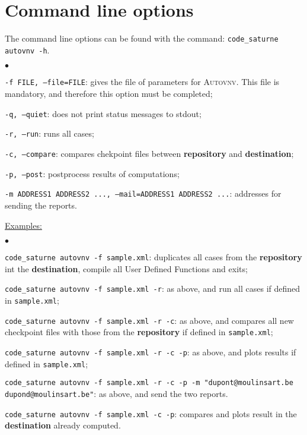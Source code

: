 \documentclass[a4paper,10pt,twoside]{article}
\begin{document}
\section{Command line options}

The command line options can be found with the command: \texttt{code\_saturne autovnv -h}.

\begin{list}{$\bullet$}{}
\item \texttt{-f FILE, --file=FILE}: gives the file of parameters for \textsc{Autovnv}.
This file is mandatory, and therefore this option must be completed;
\item \texttt{-q, --quiet}: does not print status messages to stdout;
\item \texttt{-r, --run}: runs all cases;
\item \texttt{-c, --compare}: compares chekpoint files between \textbf{repository} and \textbf{destination};
\item \texttt{-p, --post}: postprocess results of computations;
\item \texttt{-m ADDRESS1 ADDRESS2 ..., --mail=ADDRESS1 ADDRESS2 ...}: addresses for sending the reports.
\end{list}

\underline{Examples:}

\begin{list}{$\bullet$}{}
\item \texttt{code\_saturne autovnv -f sample.xml}: duplicates all cases from the \textbf{repository}
int the \textbf{destination}, compile all User Defined Functions and exits;
\item \texttt{code\_saturne autovnv -f sample.xml -r}: as above, and run all cases if defined
in \texttt{sample.xml};
\item \texttt{code\_saturne autovnv -f sample.xml -r -c}: as above, and compares all new checkpoint files
with those from the \textbf{repository} if defined in \texttt{sample.xml};
\item \texttt{code\_saturne autovnv -f sample.xml -r -c -p}: as above, and plots results
if defined in \texttt{sample.xml};
\item \texttt{code\_saturne autovnv -f sample.xml -r -c -p -m "dupont@moulinsart.be dupond@moulinsart.be"}: as above,
and send the two reports.
\item \texttt{code\_saturne autovnv -f sample.xml -c -p}: compares and plots result in the \textbf{destination}
already computed.
\end{list}
\end{document}
